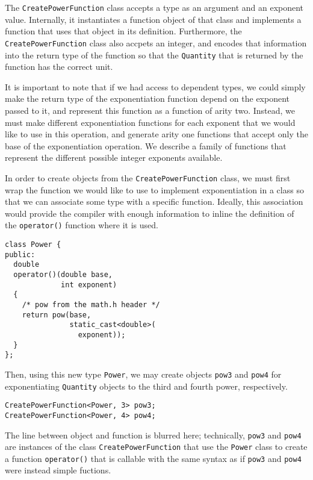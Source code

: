 \documentclass[reprint]{revtex4-1}
\begin{document}
The \verb|CreatePowerFunction| class accepts a type as an argument and an exponent value. Internally, it
instantiates a function object of that class and implements a function that uses that object in its definition.
Furthermore, the \verb|CreatePowerFunction| class also accpets an integer, and encodes that information into
the return type of the function so that the \verb|Quantity| that is returned by the function has the correct
unit.

It is important to note that if we had access to dependent types, we could simply make the return type
of the exponentiation function depend on the exponent passed to it, and represent this function as a function
of arity two. Instead, we must make different exponentiation functions for each exponent that we would like
to use in this operation, and generate arity one functions that accept only the base of the exponentiation operation.
We describe a family of functions that represent the different possible integer exponents available.

In order to create objects from the \verb|CreatePowerFunction| class, we must first wrap the function
we would like to use to implement exponentiation in a class so that we can associate some type with a
specific function. Ideally, this association would provide the compiler with enough information to inline
the definition of the \verb|operator()| function where it is used.

\begin{verbatim}
class Power {
public:
  double
  operator()(double base,
             int exponent)
  {
    /* pow from the math.h header */
    return pow(base,
               static_cast<double>(
                 exponent));
  }
};
\end{verbatim}

Then, using this new type \verb|Power|, we may create objects \verb|pow3| and \verb|pow4| for exponentiating
\verb|Quantity| objects to the third and fourth power, respectively.
\begin{verbatim}
CreatePowerFunction<Power, 3> pow3;
CreatePowerFunction<Power, 4> pow4;
\end{verbatim}

The line between object and function is blurred here; technically, \verb|pow3| and \verb|pow4| are
instances of the class \verb|CreatePowerFunction| that use the \verb|Power| class to create a function
\verb|operator()| that is callable with the same syntax as if \verb|pow3| and \verb|pow4| were instead
simple fuctions.
\end{document}
